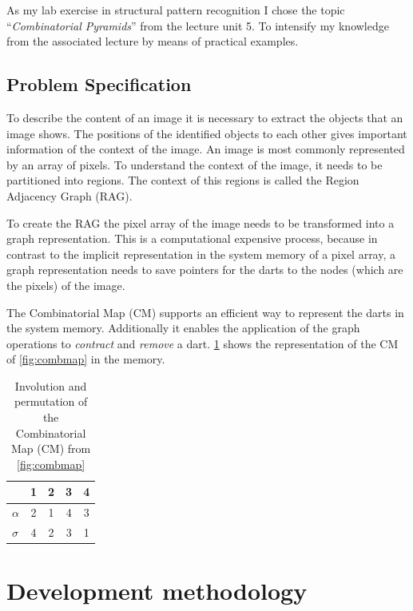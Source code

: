 \documentclass[12pt]{article}
\begin{document}
As my lab exercise in structural pattern recognition I chose the topic ``\emph{Combinatorial Pyramids}'' from the lecture unit 5. To intensify my knowledge from the associated lecture by means of practical examples.


\subsection{Problem Specification}%
\label{sub:problem}

To describe the content of an image it is necessary to extract the objects that an image shows.
The positions of the identified objects to each other gives important information of the context of the image.
An image is most commonly represented by an array of pixels.
To understand the context of the image, it needs to be partitioned into regions.
The context of this regions is called the Region Adjacency Graph (RAG).
\par
To create the RAG the pixel array of the image needs to be transformed into a graph representation.
This is a computational expensive process, because in contrast to the implicit representation in the system memory of a pixel array, a graph representation needs to save pointers for the darts to the nodes (which are the pixels) of the image.
\par
The Combinatorial Map (CM) supports an efficient way to represent the darts in the system memory.
Additionally it enables the application of the graph operations to \emph{contract} and \emph{remove} a dart. \cref{tab:combmap} shows the representation of the CM of \cref{fig:combmap} in the memory.

\begin{table}[tb]
  \caption{Involution and permutation of the Combinatorial Map (CM) from \cref{fig:combmap}}\label{tab:combmap}
  \centering

  \begin{tabular}{lcccc}
  & \textbf{1} & \textbf{2} & \textbf{3} & \textbf{4} \\
  \midrule
     \( \alpha \)& 2 & 1 & 4 & 3\\
     \( \sigma \)& 4 & 2 & 3 & 1\\
  \bottomrule
  \end{tabular}
\end{table}


\section{Development methodology}%
\label{sec:development_methodology}
\end{document}
